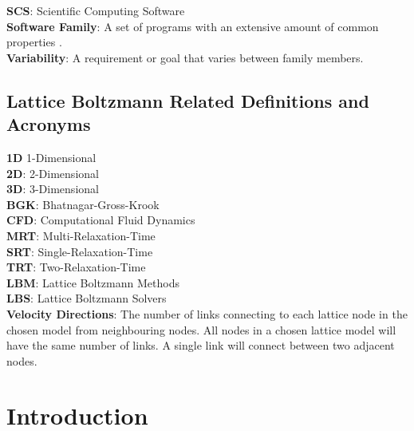 \documentclass[12pt, notitlepage]{article}
\begin{document}
\begin{singlespace}
\noindent\textbf{SCS}: Scientific Computing Software\\

\noindent\textbf{Software Family}: A set of programs with an extensive amount of common properties \cite{parnas1976design}.\\

\noindent\textbf{Variability}: A requirement or goal that varies between family members.

\newpage
\subsection*{Lattice Boltzmann Related Definitions and Acronyms}

\noindent\textbf{1D} 1-Dimensional\\

\noindent\textbf{2D}: 2-Dimensional\\

\noindent\textbf{3D}: 3-Dimensional\\

\noindent\textbf{BGK}: Bhatnagar-Gross-Krook \citep{bhatnagar1954model}\\

\noindent\textbf{CFD}: Computational Fluid Dynamics\\

\noindent\textbf{MRT}: Multi-Relaxation-Time\\

\noindent\textbf{SRT}: Single-Relaxation-Time\\

\noindent\textbf{TRT}: Two-Relaxation-Time\\

\noindent\textbf{LBM}: Lattice Boltzmann Methods\\

\noindent\textbf{LBS}: Lattice Boltzmann Solvers\\

\noindent\textbf{Velocity Directions}: The number of links connecting to each lattice node in the chosen model from neighbouring nodes. All nodes in a chosen lattice model will have the same number of links. A single link will connect between two adjacent nodes.


\end{singlespace}
\newpage
{}
\section{Introduction}
\end{document}
